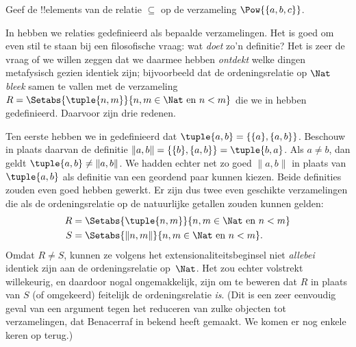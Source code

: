 \documentclass[openany]{memoir}
\begin{document}
\begin{prob}
  Geef de !!{element}s van de relatie $\subseteq$ op de verzameling
  $\Pow{\{a, b, c\}}$.
\end{prob}
\endgroup

\begingroup
\def\olfilename{OLP-0013}
\def\olfilepath{content/sets-functions-relations/relations/}
\hypertarget{unit-OLP-0013}{}
%



In  hebben we relaties gedefinieerd als bepaalde
verzamelingen. Het is goed om even stil te staan bij een filosofische
vraag: wat \emph{doet} zo'n definitie? Het is zeer de vraag of we
willen zeggen dat we daarmee hebben \emph{ontdekt} welke dingen
metafysisch gezien identiek zijn; bijvoorbeeld dat de ordeningsrelatie op $\Nat$
\emph{bleek} samen te vallen met de verzameling $R=
\Setabs{\tuple{n,m}}{n, m \in \Nat\text{ en } n < m}$ die we in
 hebben gedefinieerd. Daarvoor zijn drie redenen.

Ten eerste hebben we in  gedefinieerd
dat $\tuple{a, b} = \{\{a\}, \{a, b\}\}$. Beschouw in plaats daarvan de
definitie $\lVert a, b\rVert = \{\{b\}, \{a, b\}\} = \tuple{b,a}$. Als
$a \neq b$, dan geldt $\tuple{a, b} \neq \lVert a,b\rVert$. We hadden
echter net zo goed $\lVert a,b\rVert$ in plaats van $\tuple{a,b}$ als
definitie van een geordend paar kunnen kiezen. Beide definities zouden
even goed hebben gewerkt. Er zijn dus twee even geschikte
verzamelingen die als de ordeningsrelatie op de natuurlijke getallen
zouden kunnen gelden:
\begin{align*}
		R &= \Setabs{\tuple{n,m}}{n, m \in \Nat \text{ en }n < m}\\
		S &= \Setabs{\lVert n,m\rVert}{n, m \in \Nat \text{ en }n < m}.
\end{align*}
Omdat $R \neq S$, kunnen ze volgens het extensionaliteitsbeginsel niet
\emph{allebei} identiek zijn aan de ordeningsrelatie op~$\Nat$. Het zou
echter volstrekt willekeurig, en daardoor nogal ongemakkelijk, zijn om
te beweren dat $R$ in plaats van $S$ (of omgekeerd) feitelijk de
ordeningsrelatie \emph{is}. (Dit is een zeer eenvoudig geval van een
argument tegen het reduceren van zulke objecten tot verzamelingen, dat
Benacerraf in \citeyear{Benacerraf1965} bekend heeft gemaakt. We komen
er nog enkele keren op terug.)
\end{document}
